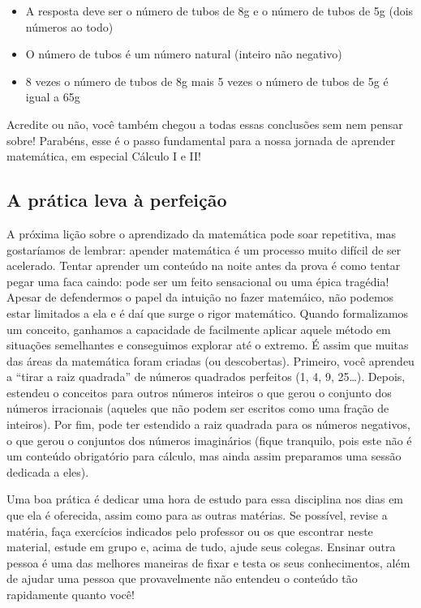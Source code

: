 \documentclass[
  portuguese,
  letterpaper,
  DIV=11,
  numbers=noendperiod]{scrreport}
\providecommand{\tightlist}{%
  \setlength{\itemsep}{0pt}\setlength{\parskip}{0pt}}
\begin{document}
\begin{itemize}
\tightlist
\item
  A resposta deve ser o número de tubos de 8g e o número de tubos de 5g
  (dois números ao todo)
\item
  O número de tubos é um número natural (inteiro não negativo)
\item
  8 vezes o número de tubos de 8g mais 5 vezes o número de tubos de 5g é
  igual a 65g
\end{itemize}

Acredite ou não, você também chegou a todas essas conclusões sem nem
pensar sobre! Parabéns, esse é o passo fundamental para a nossa jornada
de aprender matemática, em especial Cálculo I e II!

\subsection{A prática leva à
perfeição}\label{a-pruxe1tica-leva-uxe0-perfeiuxe7uxe3o}

A próxima lição sobre o aprendizado da matemática pode soar repetitiva,
mas gostaríamos de lembrar: apender matemática é um processo muito
difícil de ser acelerado. Tentar aprender um conteúdo na noite antes da
prova é como tentar pegar uma faca caindo: pode ser um feito sensacional
ou uma épica tragédia! Apesar de defendermos o papel da intuição no
fazer matemáico, não podemos estar limitados a ela e é daí que surge o
rigor matemático. Quando formalizamos um conceito, ganhamos a capacidade
de facilmente aplicar aquele método em situações semelhantes e
conseguimos explorar até o extremo. É assim que muitas das áreas da
matemática foram criadas (ou descobertas). Primeiro, você aprendeu a
``tirar a raiz quadrada'' de números quadrados perfeitos (1, 4, 9,
25\ldots). Depois, estendeu o conceitos para outros números inteiros o
que gerou o conjunto dos números irracionais (aqueles que não podem ser
escritos como uma fração de inteiros). Por fim, pode ter estendido a
raiz quadrada para os números negativos, o que gerou o conjuntos dos
números imaginários (fique tranquilo, pois este não é um conteúdo
obrigatório para cálculo, mas ainda assim preparamos uma sessão dedicada
a eles).

Uma boa prática é dedicar uma hora de estudo para essa disciplina nos
dias em que ela é oferecida, assim como para as outras matérias. Se
possível, revise a matéria, faça exercícios indicados pelo professor ou
os que escontrar neste material, estude em grupo e, acima de tudo, ajude
seus colegas. Ensinar outra pessoa é uma das melhores maneiras de fixar
e testa os seus conhecimentos, além de ajudar uma pessoa que
provavelmente não entendeu o conteúdo tão rapidamente quanto você!
\end{document}
